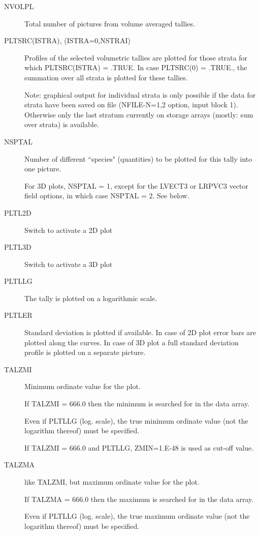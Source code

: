 \begin{description}
  \item[NVOLPL] Total number of pictures from volume averaged
        tallies.
  \item[PLTSRC(ISTRA), (ISTRA=0,NSTRAI)] Profiles of the selected volumetric
        tallies are plotted for those strata for which PLTSRC(ISTRA) = .TRUE.
        In case PLTSRC(0) = .TRUE., the summation over all strata is plotted for these
        tallies.

        Note: graphical output for individual strata is only possible if the data for
        strata have been saved on file (NFILE-N=1,2 option, input block 1).
        Otherwise only the last stratum currently on storage arrays (mostly:
        sum over strata) is available.
  \item[NSPTAL] Number of different ``species" (quantities) to be plotted for
        this tally into one picture.

        For 3D plots, NSPTAL = 1, except for the LVECT3 or LRPVC3 vector field options,
        in which case NSPTAL = 2.
        See below.
  \item[PLTL2D] Switch to activate a 2D plot
  \item[PLTL3D] Switch to activate a
        3D plot
  \item[PLTLLG] The tally is plotted on a logarithmic scale.
  \item[PLTLER] Standard deviation is plotted if available.
        In case of 2D plot error bars are plotted along the curves.
        In case of 3D plot a full standard deviation profile is plotted on a separate
        picture.
  \item[TALZMI] Minimum ordinate value for the plot.

        If TALZMI = 666.0 then the minimum is searched for in the data array.

        Even if PLTLLG (log.
        scale), the true
        minimum ordinate value (not the logarithm thereof) must be specified.

        If TALZMI = 666.0 and PLTLLG, ZMIN=1.E-48 is used as cut-off value.
  \item[TALZMA] like TALZMI, but maximum ordinate value for the plot.

        If TALZMA = 666.0 then the maximum is searched for in the data array.

        Even if PLTLLG (log.
        scale), the true
        maximum ordinate value (not the logarithm thereof) must be specified.
\end{description}

